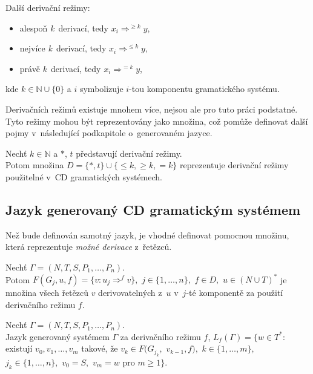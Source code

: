 Další derivační režimy:
\begin{itemize}
    \item alespoň \emph{k}~derivací, tedy $x_i \Rightarrow^{\geq k} y$,
    \item nejvíce \emph{k}~derivací, tedy $x_i \Rightarrow^{\leq k} y$,
    \item právě \emph{k}~derivací, tedy $x_i \Rightarrow^{=k} y$,
\end{itemize}
kde $k \in \mathbb{N} \cup \{0\}$ a $i$ symbolizuje $i$-tou komponentu gramatického systému.

Derivačních režimů existuje mnohem více, nejsou ale pro tuto práci podstatné.
Tyto režimy mohou být reprezentovány jako množina, což pomůže definovat další pojmy v~následující podkapitole o~generovaném jazyce.
\begin{definition}\label{def_der_rezimy}
    Nechť $k\in \mathbb{N}$ a $*$, $t$ představují derivační režimy. \\
    Potom množina $D = \{*, t\} \cup \{\leq k, \geq k, =k\}$ reprezentuje derivační režimy použitelné v~CD gramatických systémech.
\end{definition}

\subsection*{Jazyk generovaný CD gramatickým systémem}
Než bude definován samotný jazyk, je vhodné definovat pomocnou množinu, která reprezentuje \emph{možné derivace} z~řetězců.
\begin{definition}\label{def_mozne_derivace}
    Nechť $\Gamma = (N, T, S, P_1, \ldots, P_n)$. \\  
    Potom $F(G_j,u,f)=\{v:u_j\Rightarrow^{f}v\},$ $j \in \{1, \ldots, n\},$ $f\in D,$ $u\in (N \cup T)^{*}$ je množina všech řetězců $v$ derivovatelných z~$u$ v~$j$-té komponentě za použití derivačního režimu $f$.
\end{definition}
\begin{definition}\label{def_generovany_jazyk}
    Nechť $\Gamma = (N, T, S, P_1, \ldots, P_n)$. \\  
    Jazyk generovaný systémem $\Gamma$ za derivačního režimu $f$, $L_f(\Gamma) = \{ w \in T^*:$ existují $v_0, v_1,\ldots, v_m$ takové, že $v_k \in F(G_{j_{k}},$ $v_{k-1}, f),$ $k \in \{1, \ldots, m\},$ $j_k \in \{1, \ldots, n\},$ $v_0 = S,$ $v_m = w$ pro $m \geq 1\}$.  
\end{definition} 


